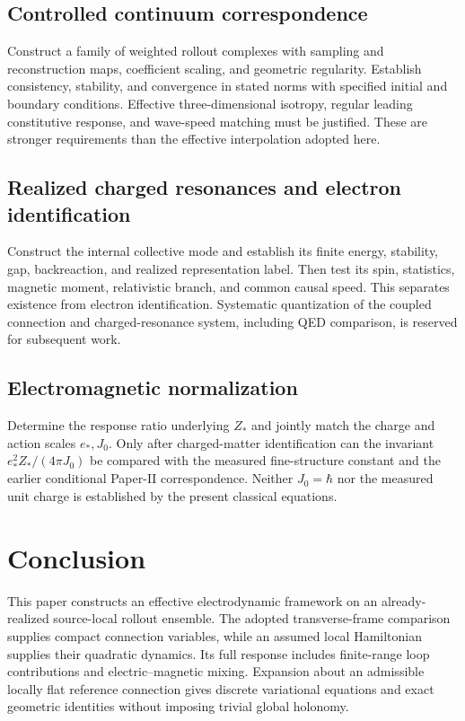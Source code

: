 \documentclass[11pt]{article}
\begin{document}
\subsection{Controlled continuum correspondence}

Construct a family of weighted rollout complexes with sampling and reconstruction maps, coefficient scaling, and geometric regularity. Establish consistency, stability, and convergence in stated norms with specified initial and boundary conditions. Effective three-dimensional isotropy, regular leading constitutive response, and wave-speed matching must be justified. These are stronger requirements than the effective interpolation adopted here.

\subsection{Realized charged resonances and electron identification}

Construct the internal collective mode and establish its finite energy, stability, gap, backreaction, and realized representation label. Then test its spin, statistics, magnetic moment, relativistic branch, and common causal speed. This separates existence from electron identification. Systematic quantization of the coupled connection and charged-resonance system, including QED comparison, is reserved for subsequent work.

\subsection{Electromagnetic normalization}

Determine the response ratio underlying $Z_*$ and jointly match the charge and action scales $e_*,J_0$. Only after charged-matter identification can the invariant $e_*^2Z_*/(4\pi J_0)$ be compared with the measured fine-structure constant and the earlier conditional Paper-II correspondence. Neither $J_0=\hbar$ nor the measured unit charge is established by the present classical equations.

\section{Conclusion}

This paper constructs an effective electrodynamic framework on an already-realized source-local rollout ensemble. The adopted transverse-frame comparison supplies compact connection variables, while an assumed local Hamiltonian supplies their quadratic dynamics. Its full response includes finite-range loop contributions and electric--magnetic mixing. Expansion about an admissible locally flat reference connection gives discrete variational equations and exact geometric identities without imposing trivial global holonomy.
\end{document}
